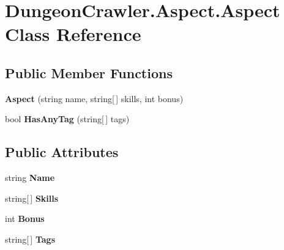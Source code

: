 \hypertarget{class_dungeon_crawler_1_1_aspect_1_1_aspect}{}\section{Dungeon\+Crawler.\+Aspect.\+Aspect Class Reference}
\label{class_dungeon_crawler_1_1_aspect_1_1_aspect}
\subsection*{Public Member Functions}
\begin{DoxyCompactItemize}
\item 
\hypertarget{class_dungeon_crawler_1_1_aspect_1_1_aspect_acbb9c550371da31ddfedf7b387d94685}{}{\bfseries Aspect} (string name, string\mbox{[}$\,$\mbox{]} skills, int bonus)\label{class_dungeon_crawler_1_1_aspect_1_1_aspect_acbb9c550371da31ddfedf7b387d94685}

\item 
\hypertarget{class_dungeon_crawler_1_1_aspect_1_1_aspect_a613274e2e4eb7524802ee8258d566c00}{}bool {\bfseries Has\+Any\+Tag} (string\mbox{[}$\,$\mbox{]} tags)\label{class_dungeon_crawler_1_1_aspect_1_1_aspect_a613274e2e4eb7524802ee8258d566c00}

\end{DoxyCompactItemize}
\subsection*{Public Attributes}
\begin{DoxyCompactItemize}
\item 
\hypertarget{class_dungeon_crawler_1_1_aspect_1_1_aspect_a5506b2b5f270d5efb91f65113fcc1b9c}{}string {\bfseries Name}\label{class_dungeon_crawler_1_1_aspect_1_1_aspect_a5506b2b5f270d5efb91f65113fcc1b9c}

\item 
\hypertarget{class_dungeon_crawler_1_1_aspect_1_1_aspect_a5b8a60b7687b4973c60acd80fc9ca0ac}{}string\mbox{[}$\,$\mbox{]} {\bfseries Skills}\label{class_dungeon_crawler_1_1_aspect_1_1_aspect_a5b8a60b7687b4973c60acd80fc9ca0ac}

\item 
\hypertarget{class_dungeon_crawler_1_1_aspect_1_1_aspect_a2fa30dba12cb0d9d6492e510f58b3a4a}{}int {\bfseries Bonus}\label{class_dungeon_crawler_1_1_aspect_1_1_aspect_a2fa30dba12cb0d9d6492e510f58b3a4a}

\item 
\hypertarget{class_dungeon_crawler_1_1_aspect_1_1_aspect_aec551622d5acd51e36c7f619eb7b82a0}{}string\mbox{[}$\,$\mbox{]} {\bfseries Tags}\label{class_dungeon_crawler_1_1_aspect_1_1_aspect_aec551622d5acd51e36c7f619eb7b82a0}

\end{DoxyCompactItemize}
